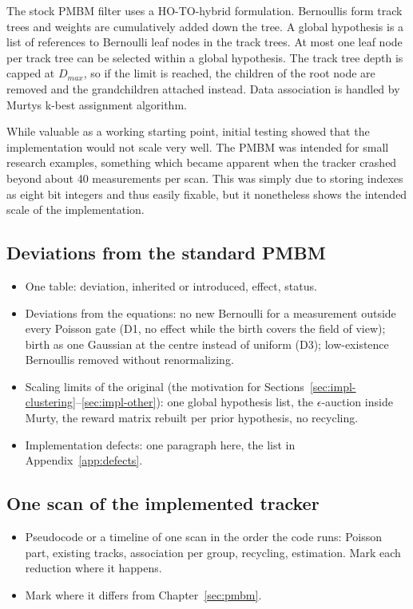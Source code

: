 The stock PMBM filter uses a HO-TO-hybrid formulation. Bernoullis form track trees and weights are cumulatively added down the tree. A global hypothesis is a list of references to Bernoulli leaf nodes in the track trees. At most one leaf node per track tree can be selected within a global hypothesis. The track tree depth is capped at $D_{max}$, so if the limit is reached, the children of the root node are removed and the grandchildren attached instead. Data association is handled by Murtys k-best assignment algorithm.
\medskip

While valuable as a working starting point, initial testing showed that the implementation would not scale very well. The PMBM was intended for small research examples, something which became apparent when the tracker crashed beyond about 40 measurements per scan. This was simply due to storing indexes as eight bit integers and thus easily fixable, but it nonetheless shows the intended scale of the implementation.

\subsection{Deviations from the standard PMBM}
\label{sec:impl-deviations}
\begin{itemize}
    \item One table: deviation, inherited or introduced, effect, status.
    \item Deviations from the equations: no new Bernoulli for a measurement outside every Poisson gate (D1, no effect while the birth covers the field of view); birth as one Gaussian at the centre instead of uniform (D3); low-existence Bernoullis removed without renormalizing.
    \item Scaling limits of the original (the motivation for Sections~\ref{sec:impl-clustering}--\ref{sec:impl-other}): one global hypothesis list, the $\epsilon$-auction inside Murty, the reward matrix rebuilt per prior hypothesis, no recycling.
    \item Implementation defects: one paragraph here, the list in Appendix~\ref{app:defects}.
\end{itemize}

\subsection{One scan of the implemented tracker}
\label{sec:impl-scan}
\begin{itemize}
    \item Pseudocode or a timeline of one scan in the order the code runs: Poisson part, existing tracks, association per group, recycling, estimation. Mark each reduction where it happens.
    \item Mark where it differs from Chapter~\ref{sec:pmbm}.
\end{itemize}

